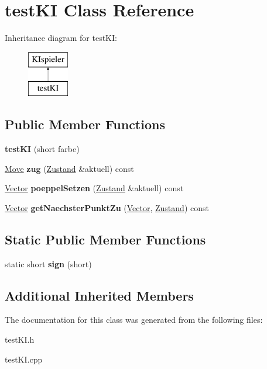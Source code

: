 \hypertarget{classtest_k_i}{\section{test\-K\-I Class Reference}
\label{classtest_k_i}
}
Inheritance diagram for test\-K\-I\-:\begin{figure}[H]
\begin{center}
\leavevmode
\includegraphics[height=2.000000cm]{classtest_k_i}
\end{center}
\end{figure}
\subsection*{Public Member Functions}
\begin{DoxyCompactItemize}
\item 
\hypertarget{classtest_k_i_acd40268381fc1797e7e248d0420c91a7}{{\bfseries test\-K\-I} (short farbe)}\label{classtest_k_i_acd40268381fc1797e7e248d0420c91a7}

\item 
\hypertarget{classtest_k_i_a059c0c3f15e61b1877419e65e99fb39f}{\hyperlink{class_move}{Move} {\bfseries zug} (\hyperlink{class_zustand}{Zustand} \&aktuell) const }\label{classtest_k_i_a059c0c3f15e61b1877419e65e99fb39f}

\item 
\hypertarget{classtest_k_i_a2d70af8f63fd66d1341e785f2c16e365}{\hyperlink{class_vector}{Vector} {\bfseries poeppel\-Setzen} (\hyperlink{class_zustand}{Zustand} \&aktuell) const }\label{classtest_k_i_a2d70af8f63fd66d1341e785f2c16e365}

\item 
\hypertarget{classtest_k_i_a55b11883fed10cac8c23f83c202f6188}{\hyperlink{class_vector}{Vector} {\bfseries get\-Naechster\-Punkt\-Zu} (\hyperlink{class_vector}{Vector}, \hyperlink{class_zustand}{Zustand}) const }\label{classtest_k_i_a55b11883fed10cac8c23f83c202f6188}

\end{DoxyCompactItemize}
\subsection*{Static Public Member Functions}
\begin{DoxyCompactItemize}
\item 
\hypertarget{classtest_k_i_a22f65151709965a8d75c82ebc34f3c14}{static short {\bfseries sign} (short)}\label{classtest_k_i_a22f65151709965a8d75c82ebc34f3c14}

\end{DoxyCompactItemize}
\subsection*{Additional Inherited Members}


The documentation for this class was generated from the following files\-:\begin{DoxyCompactItemize}
\item 
test\-K\-I.\-h\item 
test\-K\-I.\-cpp\end{DoxyCompactItemize}
